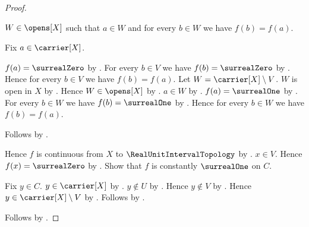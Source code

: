 \begin{proof}
\begin{subproof}
\begin{subproof}
                $W\in\opens[X]$ such that $a\in W$ and
                for every $b\in W$ we have $f(b)=f(a)$.
            \begin{subproof}
                Fix $a\in\carrier[X]$.
                \begin{byCase}
                        $f(a)=\surrealZero$
                            by .
                        For every $b\in V$ we have $f(b)=\surrealZero$
                            by .
                        Hence for every $b\in V$ we have $f(b)=f(a)$.
                        Let $W=\carrier[X]\setminus V$.
                        $W$ is open in $X$
                            by .
                        Hence $W\in\opens[X]$ by .
                        $a\in W$ by .
                        $f(a)=\surrealOne$
                            by .
                        For every $b\in W$ we have $f(b)=\surrealOne$
                            by .
                        Hence for every $b\in W$ we have $f(b)=f(a)$.
                \end{byCase}
            \end{subproof}
            Follows by .
        \end{subproof}
        Hence $f$ is continuous from $X$ to $\RealUnitIntervalTopology$
            by .
        $x\in V$.
        Hence $f(x)=\surrealZero$ by .
        Show that $f$ is constantly $\surrealOne$ on $C$.
        \begin{subproof}
            Fix $y\in C$.
            $y\in\carrier[X]$ by .
            $y\notin U$ by .
            Hence $y\notin V$ by .
            Hence $y\in\carrier[X]\setminus V$ by .
            Follows by .
        \end{subproof}
    \end{subproof}
    Follows by .
\end{proof}
